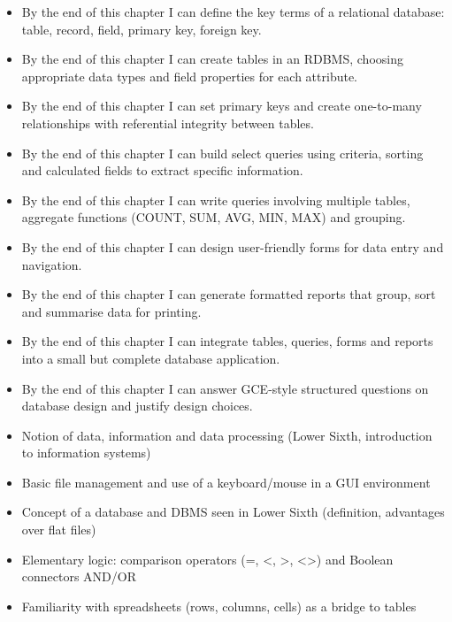 \documentclass[11pt]{article}
\begin{document}
\begin{objectifs}
\begin{itemize}
\item By the end of this chapter I can define the key terms of a relational database: table, record, field, primary key, foreign key.
\item By the end of this chapter I can create tables in an RDBMS, choosing appropriate data types and field properties for each attribute.
\item By the end of this chapter I can set primary keys and create one-to-many relationships with referential integrity between tables.
\item By the end of this chapter I can build select queries using criteria, sorting and calculated fields to extract specific information.
\item By the end of this chapter I can write queries involving multiple tables, aggregate functions (COUNT, SUM, AVG, MIN, MAX) and grouping.
\item By the end of this chapter I can design user-friendly forms for data entry and navigation.
\item By the end of this chapter I can generate formatted reports that group, sort and summarise data for printing.
\item By the end of this chapter I can integrate tables, queries, forms and reports into a small but complete database application.
\item By the end of this chapter I can answer GCE-style structured questions on database design and justify design choices.
\end{itemize}
\end{objectifs}

\begin{prerequis}
\begin{itemize}
\item Notion of data, information and data processing (Lower Sixth, introduction to information systems)
\item Basic file management and use of a keyboard/mouse in a GUI environment
\item Concept of a database and DBMS seen in Lower Sixth (definition, advantages over flat files)
\item Elementary logic: comparison operators (=, <, >, <>) and Boolean connectors AND/OR
\item Familiarity with spreadsheets (rows, columns, cells) as a bridge to tables
\end{itemize}
\end{prerequis}
\end{document}
